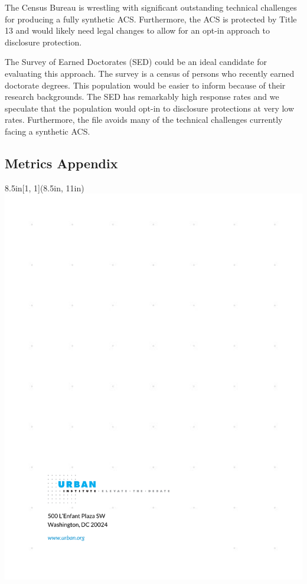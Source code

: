 \documentclass[
]{urban-formatting}
\begin{document}
The Census Bureau is wrestling with significant outstanding technical
challenges for producing a fully synthetic ACS. Furthermore, the ACS is
protected by Title 13 and would likely need legal changes to allow for
an opt-in approach to disclosure protection.

The Survey of Earned Doctorates (SED) could be an ideal candidate for
evaluating this approach. The survey is a census of persons who recently
earned doctorate degrees. This population would be easier to inform
because of their research backgrounds. The SED has remarkably high
response rates and we speculate that the population would opt-in to
disclosure protections at very low rates. Furthermore, the file avoids
many of the technical challenges currently facing a synthetic ACS.

\subsection{Metrics Appendix}











\newpage
\thispagestyle{empty}

\begin{textblock*}{8.5in}[1, 1](8.5in, 11in)
    \noindent\includegraphics[width=\paperwidth,height=\paperheight]{images/back.pdf}
\end{textblock*}
\end{document}
